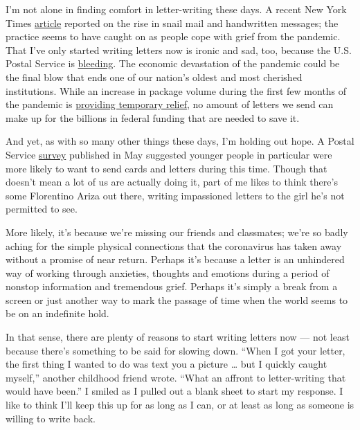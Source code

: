 I'm not alone in finding comfort in letter-writing these days. A recent
New York Times
\href{https://www.nytimes.com/2020/06/24/style/mail-letters-coronavirus.html}{article}
reported on the rise in snail mail and handwritten messages; the
practice seems to have caught on as people cope with grief from the
pandemic. That I've only started writing letters now is ironic and sad,
too, because the U.S. Postal Service is
\href{https://slate.com/news-and-politics/2020/05/coronavirus-postal-service-office-congress-money-trouble.html}{bleeding}.
The economic devastation of the pandemic could be the final blow that
ends one of our nation's oldest and most cherished institutions. While
an increase in package volume during the first few months of the
pandemic is
\href{https://www.washingtonpost.com/business/2020/06/25/postal-service-packages-coronavirus/}{providing
temporary relief}, no amount of letters we send can make up for the
billions in federal funding that are needed to save it.

And yet, as with so many other things these days, I'm holding out hope.
A Postal Service
\href{https://postalpro.usps.com/market-research/covid-mail-attitudes}{survey}
published in May suggested younger people in particular were more likely
to want to send cards and letters during this time. Though that doesn't
mean a lot of us are actually doing it, part of me likes to think
there's some Florentino Ariza out there, writing impassioned letters to
the girl he's not permitted to see.

More likely, it's because we're missing our friends and classmates;
we're so badly aching for the simple physical connections that the
coronavirus has taken away without a promise of near return. Perhaps
it's because a letter is an unhindered way of working through anxieties,
thoughts and emotions during a period of nonstop information and
tremendous grief. Perhaps it's simply a break from a screen or just
another way to mark the passage of time when the world seems to be on an
indefinite hold.

In that sense, there are plenty of reasons to start writing letters now
--- not least because there's something to be said for slowing down.
``When I got your letter, the first thing I wanted to do was text you a
picture \ldots{} but I quickly caught myself,'' another childhood friend
wrote. ``What an affront to letter-writing that would have been.'' I
smiled as I pulled out a blank sheet to start my response. I like to
think I'll keep this up for as long as I can, or at least as long as
someone is willing to write back.

